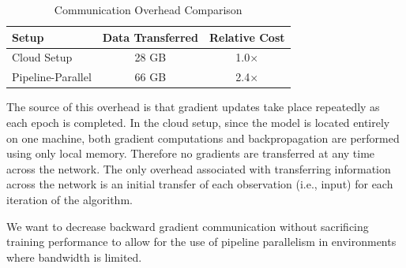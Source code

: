 \begin{table}[htbp]
\caption{Communication Overhead Comparison}
\begin{center}
\begin{tabular}{|l|c|c|}
\hline
\textbf{Setup} & \textbf{Data Transferred} & \textbf{Relative Cost} \\
\hline
Cloud Setup & 28 GB & 1.0$\times$ \\
Pipeline-Parallel & 66 GB & 2.4$\times$ \\
\hline
\end{tabular}
\label{tab:data_transfer}
\end{center}
\end{table}

The source of this overhead is that gradient updates take place repeatedly as each epoch is completed. In the cloud setup, since the model is located entirely on one machine, both gradient computations and backpropagation are performed using only local memory. Therefore no gradients are transferred at any time across the network. The only overhead associated with transferring information across the network is an initial transfer of each observation (i.e., input) for each iteration of the algorithm.

We want to decrease backward gradient communication without sacrificing training performance to allow for the use of pipeline parallelism in environments where bandwidth is limited.
